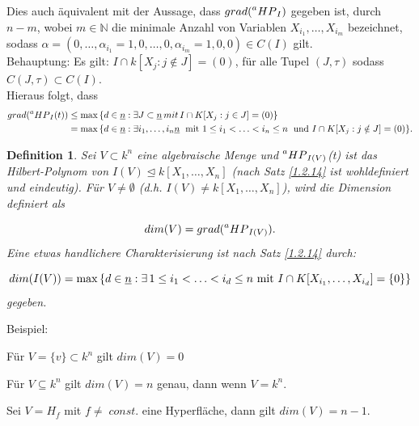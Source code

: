 \documentclass{article}
\newtheorem{definition}[satz]{Definition}
\newcommand*{\R}{k[X_{1},\ldots,X_{n}]}
\newcommand*{\indx}[2]{{#1}_{#2}}
\newcommand*{\hp}[1]{$\prescript{a}{}{HP}_{#1}$}
\begin{document}
\begin{compactenum}
Dies auch äquivalent mit der Aussage, dass $grad(\textnormal{\hp{I}})$ gegeben ist, durch $n-m$, wobei $m\in\mathbb{N}$ die minimale Anzahl von Variablen $\indx{X}{\indx{i}{1}},\ldots,\indx{X}{\indx{i}{m}}$ bezeichnet, sodass $\alpha=(0,\ldots,\indx{\alpha}{\indx{i}{1}}=1,0,\ldots,0,\indx{\alpha}{\indx{i}{m}}=1,0,0)\in C(I)$ gilt.\\
	
Behauptung: Es gilt: $I\cap k\left[\indx{X}{j}:j\notin J\right]={(0)}$, für alle Tupel $(J,\tau)$ sodass $C(J,\tau)\subset C(I)$.\\

Hieraus folgt, dass
\begin{align*}
grad(\textnormal{\hp{I}}(t))&\leq \max{\{d\in\underline{n}:\exists J\subset\underline{n}\, mit\,I\cap K[\indx{X}{j}:j\in J]=(0)\}}\\&
= \max{\{d\in\underline{n}:\exists \indx{i}{1},\ldots,\indx{i}{n}\underline{n}\; \textnormal{ mit }  1\leq\indx{i}{1}<\ldots<\indx{i}{n}\leq n\;\textnormal{ und }I\cap K[\indx{X}{j}:j\notin J]=(0)\}}.
\end{align*}
\end{compactenum}

\begin{definition}
	Sei $V\subset k^n$ eine algebraische Menge und \hp{I(V)}(t) ist das Hilbert-Polynom von $I(V)\unlhd\R$ (nach Satz \ref{1.2.14} ist wohldefiniert und eindeutig). Für $V\neq\emptyset$ (d.h. $I(V)\neq\R$), wird die Dimension definiert als 
	
	\begin{displaymath}
	dim(V)=grad(\textnormal{\hp{I(V)}}).
	\end{displaymath}
	Eine etwas handlichere Charakterisierung ist nach Satz \ref{1.2.14} durch:
	
	\begin{displaymath}
	dim(I(V))=\max{\{d\in\underline{n}:\exists{\,} 1\leq\indx{i}{1}<\ldots<\indx{i}{d}\leq n \textnormal{ mit } I\cap K[\indx{X}{\indx{i}{1}},\ldots,\indx{X}{\indx{i}{d}}]=\{0\} \}}
	\end{displaymath}
	gegeben.\\
\end{definition}
Beispiel: 
\begin{compactenum}
	\item Für $V=\{v\}\subset k^n$ gilt $dim(V)=0$
	\item Für $V\subseteq k^n$ gilt $dim(V)=n$ genau, dann wenn $V=k^n$.
	\item Sei $V=\indx{H}{f}$ mit $f\neq\; const.$ eine Hyperfläche, dann gilt $dim(V)=n-1$.\\
\end{compactenum}
\end{document}
